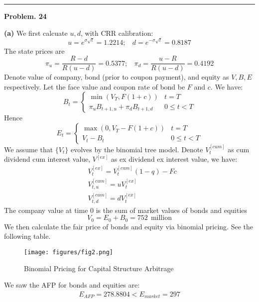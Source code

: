 \documentclass[10 pt]{hwtemplate} %
\begin{document}
\noindent\rule{16cm}{0.4pt}
\textbf{Problem. 24} 
\begin{solution} \textbf{(a)}
We first calcuate $u,d$, with CRR calibration:
\begin{equation}
  u = e^{\sigma \sqrt{t}}=1.2214;~~~~d = e^{-\sigma \sqrt{t}}=0.8187
\end{equation}
The state prices are
\begin{equation}
  \pi_u = \frac{R-d}{R(u-d)} = 0.5377;~~~~  \pi_d = \frac{u-R}{R(u-d)} = 0.4192
\end{equation}
Denote value of company, bond (prior to coupon payment), and equity as $V, B, E$ respectively. Let the face value and coupon rate of bond be $F$ and $c$. We have:
$$
B_t = \begin{cases}\min(V_T, F(1+c)) & t=T\\
\pi_u B_{t+1, u}+\pi_d B_{t+1, d} & 0\leq t< T
\end{cases}
$$
Hence
$$
E_t =\begin{cases}\max(0, V_T - F(1+c)) & t=T \\
V_t -B_t & 0\leq t< T
\end{cases}
$$
We assume that $\{V_t\}$ evolves by the binomial tree model. Denote $V_t^{[cum]}$ as cum dividend cum interest value, $V^{[ex]}$ as ex dividend ex interest value, we have:
\begin{equation}
  \begin{split}
     &V_t^{[ex]} = V_t^{[cum]}(1-q) - Fc\\
     &V_{t,u}^{[cum]} = uV_{t}^{[ex]}\\
     &V_{t,d}^{[cum]} = dV_{t}^{[ex]}
  \end{split}
\end{equation}
The company value at time $0$ is the sum of market values of bonds and equities
$$
V_0 = E_0 + B_0 = 752~~\text{million}
$$
We then calculate the fair price of bonds and equity via binomial pricing. See the following table.
\begin{figure}[H]
  \centering
  \captionsetup{justification=centering}
  \caption{Binomial Pricing for Capital Structure Arbitrage}
  \texttt{[image: figures/fig2.png]}
\end{figure}
We saw the AFP for bonds and equities are:
\begin{equation}
	\begin{split}
		E_{AFP} = 278.8804 < E_{market} = 297 \\

\end{split}
\end{equation}
\end{solution}
\end{document}
